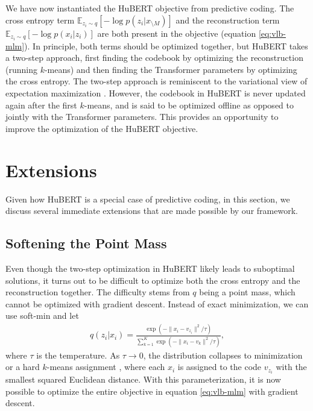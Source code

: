 \documentclass[11pt,a4paper]{article}
\begin{document}
We have now instantiated the HuBERT objective from predictive coding.
The cross entropy term $\mathbb{E}_{z_i \sim q}[-\log p(z_i | x_{\setminus M})]$ and the reconstruction term $\mathbb{E}_{z_i \sim q}[-\log p(x_i | z_i)]$ are both present in the objective (equation \ref{eq:vlb-mlm}).
In principle, both terms should be optimized together,
but HuBERT takes a two-step approach, first finding the codebook by optimizing
the reconstruction (running $k$-means)
and then finding the Transformer parameters by optimizing the cross entropy.
The two-step approach is reminiscent to the variational view of expectation maximization \citep{neal1998view,attias1999variational}.
However, the codebook in HuBERT is never updated again after the first $k$-means,
and is said to be optimized offline as opposed to jointly with the Transformer
parameters.
This provides an opportunity to improve the optimization of the HuBERT objective.

\section{Extensions}
\label{sec:extensions}

%
Given how HuBERT is a special case of predictive coding, in this section, we discuss several immediate extensions that are made possible by our framework.

\subsection{Softening the Point Mass}

Even though the two-step optimization in HuBERT likely leads to suboptimal solutions, it turns out to be difficult to optimize both the cross entropy and the reconstruction together.
The difficulty stems from $q$ being a point mass, which cannot be optimized with gradient descent.
Instead of exact minimization, we can use soft-min and let
\begin{align}
q(z_i|x_i) = \frac{\exp\left(-\|x_i - v_{z_i}\|^2 / \tau\right)}
  {\sum_{k=1}^{K} \exp\left(-\|x_i - v_k\|^2 / \tau\right)},
  \label{eq:softmax-q}
\end{align}
where $\tau$ is the temperature.
As $\tau \to 0$, the distribution collapses to minimization or a hard $k$-means assignment \citep{Kulis2011RevisitingKN}, where each $x_i$ is assigned to the code $v_{z_i}$ with the smallest squared Euclidean distance.
With this parameterization, it is now possible to optimize the entire objective in equation \ref{eq:vlb-mlm} with gradient descent.
%
\end{document}
